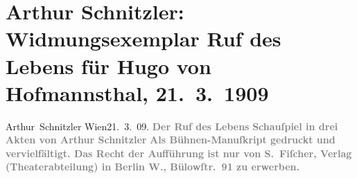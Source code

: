 

         
         \renewcommand{\erwaehntePersonen}{Personen: Hugo von Hofmannsthal}
         \renewcommand{\erwaehnteInstitutionen}{Institutionen: S. Fischer Verlag}
         \renewcommand{\erwaehnteOrte}{Orte: Bülowstraße, Wien}
         \renewcommand{\erwaehnteWerke}{Werke: Der Ruf des Lebens. Schauspiel in drei Akten}
               \section[Arthur Schnitzler: Widmungsexemplar Ruf des Lebens für Hugo von Hofmannsthal, 21. 3. 1909]{ Arthur Schnitzler: Widmungsexemplar Ruf des Lebens für Hugo von
                    Hofmannsthal, 21. 3. 1909}\nopagebreak{}\rehead{ }\begin{ledgroupsized}[t]{13cm}\normalsize\beginnumbering \toendnotes[C]{\smallbreak\pagebreak[2]} 
\pstart \spacefill\mbox{{\pb}Arthur Schnitzler}\pend{}\pstart
           Wien21. 3. 09.\pend
           {\bigskip}\pstart
           \noindent{}{\pb}\textcolor{gray}{\textbf{Der Ruf des Lebens}}\pend
           \pstart
           \textcolor{gray}{\textbf{Schauſpiel in drei Akten von Arthur Schnitzler}}\pend
           {\bigskip}\pstart
           \noindent{}\textcolor{gray}{\textbf{Als Bühnen-Manuſkript gedruckt und vervielfältigt. Das
                        Recht der Aufführung ist nur von S. Fiſcher,
                            Verlag (Theaterabteilung) in Berlin W.,
                            Bülowſtr. 91 zu erwerben.}}\pend
           
         
         \endnumbering{}\end{ledgroupsized}  \newcommand{\dateiname}{L01833}\newcommand{\titel}{Arthur Schnitzler: Widmungsexemplar Ruf des Lebens für Hugo von Hofmannsthal, 21. 3. 1909}\newcommand{\editorInnen}{Martin Anton Müller und Gerd-Hermann Susen}
      